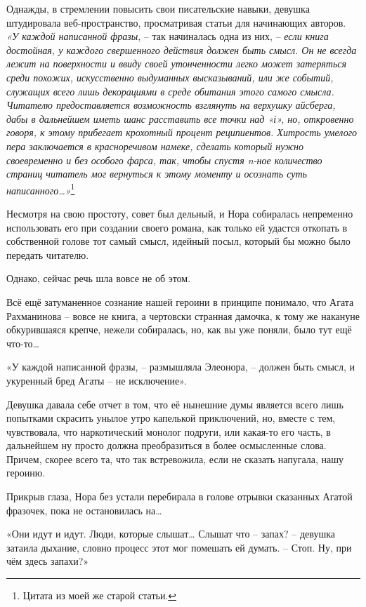 \documentclass[
  a5paperpaper,
  DIV=11,
  numbers=noendperiod]{scrreprt}
\begin{document}
Однажды, в стремлении повысить свои писательские навыки, девушка
штудировала веб-пространство, просматривая статьи для начинающих
авторов. \emph{«У каждой написанной фразы}, -- так начиналась одна из
них, -- \emph{если книга достойная, у каждого свершенного действия
должен быть смысл. Он не всегда лежит на поверхности и ввиду своей
утонченности легко может затеряться среди похожих, искусственно
выдуманных высказываний, или же событий, служащих всего лишь декорациями
в среде обитания этого самого смысла. Читателю предоставляется
возможность взглянуть на верхушку айсберга, дабы в дальнейшем иметь шанс
расставить все точки над «і», но, откровенно говоря, к этому прибегает
крохотный процент реципиентов. Хитрость умелого пера заключается в
красноречивом намеке, сделать который нужно своевременно и без особого
фарса, так, чтобы спустя n-ное количество страниц читатель мог вернуться
к этому моменту и осознать суть написанного\ldots»}\footnote{Цитата из
  моей же старой статьи.}

Несмотря на свою простоту, совет был дельный, и Нора собиралась
непременно использовать его при создании своего романа, как только ей
удастся откопать в собственной голове тот самый смысл, идейный посыл,
который бы можно было передать читателю.

Однако, сейчас речь шла вовсе не об этом.

Всё ещё затуманенное сознание нашей героини в принципе понимало, что
Агата Рахманинова -- вовсе не книга, а чертовски странная дамочка, к
тому же накануне обкурившаяся крепче, нежели собиралась, но, как вы уже
поняли, было тут ещё что-то\ldots{}

«У каждой написанной фразы, -- размышляла Элеонора, -- должен быть
смысл, и укуренный бред Агаты -- не исключение».

Девушка давала себе отчет в том, что её нынешние думы является всего
лишь попытками скрасить унылое утро капелькой приключений, но, вместе с
тем, чувствовала, что наркотический монолог подруги, или какая-то его
часть, в дальнейшем ну просто должна преобразиться в более осмысленные
слова. Причем, скорее всего та, что так встревожила, если не сказать
напугала, нашу героиню.

Прикрыв глаза, Нора без устали перебирала в голове отрывки сказанных
Агатой фразочек, пока не остановилась на\ldots{}

«Они идут и идут. Люди, которые слышат\ldots{} Слышат что -- запах? --
девушка затаила дыхание, словно процесс этот мог помешать ей думать. --
Стоп. Ну, при чём здесь запахи?»
\end{document}
